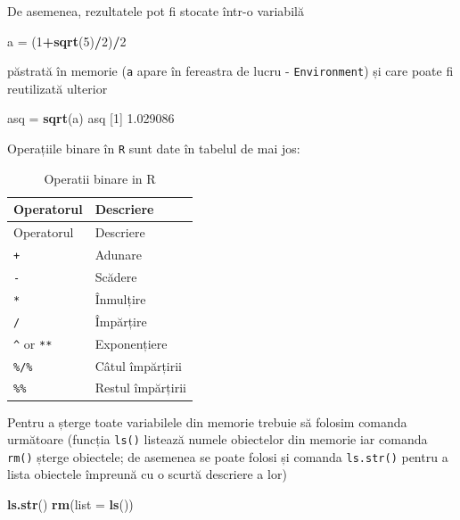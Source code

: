 \documentclass[]{article}
\newenvironment{Shaded}{\begin{snugshade}}{\end{snugshade}}
\newcommand{\KeywordTok}[1]{\textcolor[rgb]{0.13,0.29,0.53}{\textbf{#1}}}
\newcommand{\DataTypeTok}[1]{\textcolor[rgb]{0.13,0.29,0.53}{#1}}
\newcommand{\DecValTok}[1]{\textcolor[rgb]{0.00,0.00,0.81}{#1}}
\newcommand{\FloatTok}[1]{\textcolor[rgb]{0.00,0.00,0.81}{#1}}
\newcommand{\StringTok}[1]{\textcolor[rgb]{0.31,0.60,0.02}{#1}}
\newcommand{\OperatorTok}[1]{\textcolor[rgb]{0.81,0.36,0.00}{\textbf{#1}}}
\newcommand{\NormalTok}[1]{#1}
\begin{document}
De asemenea, rezultatele pot fi stocate într-o variabilă

\begin{Shaded}
\begin{Highlighting}[]
\NormalTok{a =}\StringTok{ }\NormalTok{(}\DecValTok{1}\OperatorTok{+}\KeywordTok{sqrt}\NormalTok{(}\DecValTok{5}\NormalTok{)}\OperatorTok{/}\DecValTok{2}\NormalTok{)}\OperatorTok{/}\DecValTok{2}
\end{Highlighting}
\end{Shaded}

păstrată în memorie (\texttt{a} apare în fereastra de lucru -
\texttt{Environment}) și care poate fi reutilizată ulterior

\begin{Shaded}
\begin{Highlighting}[]
\NormalTok{asq =}\StringTok{ }\KeywordTok{sqrt}\NormalTok{(a)}
\NormalTok{asq}
\NormalTok{[}\DecValTok{1}\NormalTok{] }\FloatTok{1.029086}
\end{Highlighting}
\end{Shaded}

Operațiile binare în \texttt{R} sunt date în tabelul de mai jos:

\begin{longtable}[]{@{}ll@{}}
\caption{Operatii binare in R}\tabularnewline
\toprule
Operatorul & Descriere\tabularnewline
\midrule
\endfirsthead
\toprule
Operatorul & Descriere\tabularnewline
\midrule
\endhead
\texttt{+} & Adunare\tabularnewline
\texttt{-} & Scădere\tabularnewline
\texttt{*} & Înmulțire\tabularnewline
\texttt{/} & Împărțire\tabularnewline
\texttt{\^{}} or \texttt{**} & Exponențiere\tabularnewline
\texttt{\%/\%} & Câtul împărțirii\tabularnewline
\texttt{\%\%} & Restul împărțirii\tabularnewline
\bottomrule
\end{longtable}

Pentru a șterge toate variabilele din memorie trebuie să folosim comanda
următoare (funcția \texttt{ls()} listează numele obiectelor din memorie
iar comanda \texttt{rm()} șterge obiectele; de asemenea se poate folosi
și comanda \texttt{ls.str()} pentru a lista obiectele împreună cu o
scurtă descriere a lor)

\begin{Shaded}
\begin{Highlighting}[]
\KeywordTok{ls.str}\NormalTok{()}
\KeywordTok{rm}\NormalTok{(}\DataTypeTok{list =} \KeywordTok{ls}\NormalTok{())}
\end{Highlighting}
\end{Shaded}
\end{document}
